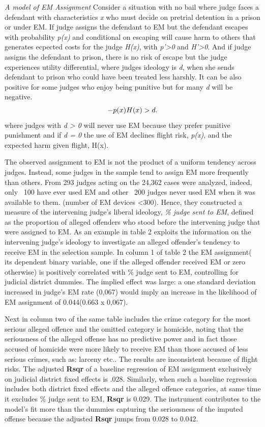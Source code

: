 \documentclass[a4paper,12pt]{article}
\begin{document}
\textit{A model of EM Assignment}
Consider a situation with no bail where judge faces a defendant with characteristics \textit{x} who must decide on pretrial detention in a prison or under EM. If judge assigns the defendant to EM but the defendant escapes with probability \textit{p(x)} and conditional on escaping will cause harm to others that generates ecpected costs for the judge \textit{H(x)}, with \textit{p'>0} and \textit{H'>0}. And if judge assigns the defendant to prison, there is no risk of escape but the judge experiences utility differential, where judges ideology is \textit{d}, when she sends defendant to prison who could have been treated less harshly. It can be also positive for some judges who enjoy being punitive but for many \textit{d} will be negative. 
\begin{equation}
    \centering
    - p(x)H(x) > d.
\end{equation}
where judges with \textit{d > 0} will never use EM because they prefer punitive punishment and if \textit{d = 0} the use of EM declines flight risk, \textit{p(x)}, and the expected harm given flight, H(x).  

The observed assignment to EM is not the product of a uniform tendency across judges. Instead, some judges in the sample tend to assign EM more frequently than others. From 293 judges acting on the 24,362 cases were analyzed, indeed, only ~100 have ever used EM and other ~200 judges never used EM when it was available to them. (number of EM devices <300). Hence, they constructed a measure of the intervening judge's liberal ideology, \textit{ \% judge sent to EM}, defined as the proportion of alleged offenders who stood before the intervening judge that were assigned to EM. 
As an example in table 2 exploits the information on the intervening judge's ideology to investigate an alleged offender's tendency to receive EM in the selection sample. In column 1 of table 2 the EM assignment( its dependent binary variable, one if the alleged offender received EM or zero otherwise) is positively correlated with \% judge sent to EM, controlling for judicial district dummies. The implied effect was large: a one standard deviation increased in judge's EM rate (0,067) would imply an increase in the likelihood of EM assignment of 0.044(0.663 x 0,067). 

Next in column two of the same table includes the crime category for the most serious alleged offence and the omitted category is homicide, noting that the seriousness of the alleged offense has no predictive power and in fact those accused of homicide were more likely to receive EM than those accused of less serious crimes, such as: larceny etc.. The results are inconsistent because of flight risks. The adjusted \textbf{Rsqr} of a baseline regression of EM assignment exclusively on judicial district fixed effects is .028. Similarly, when such a baseline regression includes both district fixed effects and the alleged offence categories, at same time it excludes \% judge sent to EM, \textbf{Rsqr} is 0.029. The instrument contributes to the model's fit more than the dummies capturing the seriousness of the imputed offense because the adjusted \textbf{Rsqr} jumps from 0.028 to 0.042.  
\end{document}
